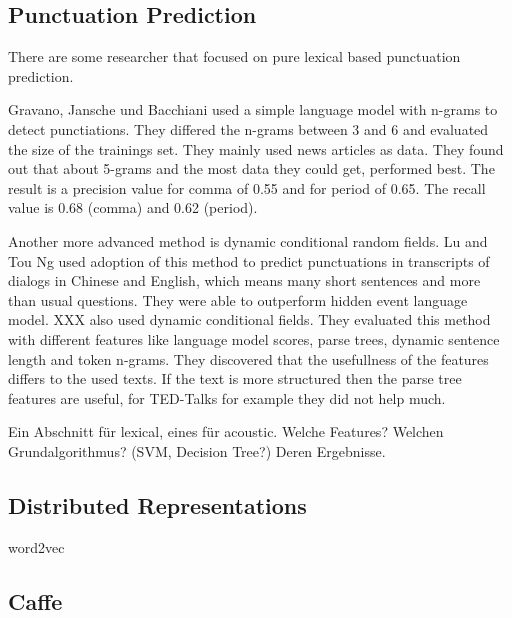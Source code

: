 
\subsection{Punctuation Prediction}
There are some researcher that focused on pure lexical based punctuation prediction.

Gravano, Jansche und Bacchiani used a simple language model with n-grams to detect punctiations. 
They differed the n-grams between 3 and 6 and evaluated the size of the trainings set. 
They mainly used news articles as data. They found out that about 5-grams and the most data they could get, performed best.
The result is a precision value for comma of 0.55 and for period of 0.65. 
The recall value is 0.68 (comma) and 0.62 (period). 

Another more advanced method is dynamic conditional random fields. 
Lu and Tou Ng used adoption of this method to predict punctuations in transcripts of dialogs in Chinese and English, which means many short sentences and more than usual questions. 
They were able to outperform hidden event language model.
XXX also used dynamic conditional fields. They evaluated this method with different features like language model scores, parse trees, dynamic sentence length and token n-grams. 
They discovered that the usefullness of the features differs to the used texts. If the text is more structured then the parse tree features are useful, for TED-Talks for example they did not help much.
 
 
Ein Abschnitt für lexical, eines für acoustic.
Welche Features?
Welchen Grundalgorithmus? (SVM, Decision Tree?)
Deren Ergebnisse.



\subsection{Distributed Representations}
word2vec
\subsection{Caffe}
